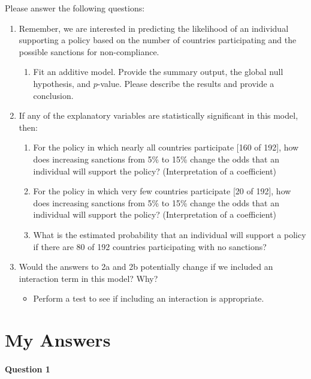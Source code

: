\documentclass[12pt,letterpaper]{article}
\begin{document}
\newpage
\noindent Please answer the following questions:

\begin{enumerate}
	\item
	Remember, we are interested in predicting the likelihood of an individual supporting a policy based on the number of countries participating and the possible sanctions for non-compliance.
	\begin{enumerate}
		\item [] Fit an additive model. Provide the summary output, the global null hypothesis, and $p$-value. Please describe the results and provide a conclusion.

	\end{enumerate}


	\item
	If any of the explanatory variables are statistically significant in this model, then:
	\begin{enumerate}
		\item
		For the policy in which nearly all countries participate [160 of 192], how does increasing sanctions from 5\% to 15\% change the odds that an individual will support the policy? (Interpretation of a coefficient)
		\item
		For the policy in which very few countries participate [20 of 192], how does increasing sanctions from 5\% to 15\% change the odds that an individual will support the policy? (Interpretation of a coefficient)
		\item
		What is the estimated probability that an individual will support a policy if there are 80 of 192 countries participating with no sanctions? 
	
	\end{enumerate}
	\item
	Would the answers to 2a and 2b potentially change if we included an interaction term in this model? Why? 
	\begin{itemize}
		\item Perform a test to see if including an interaction is appropriate.
	\end{itemize}
	\end{enumerate}





\section*{My Answers}

\paragraph{Question 1}
\end{document}
